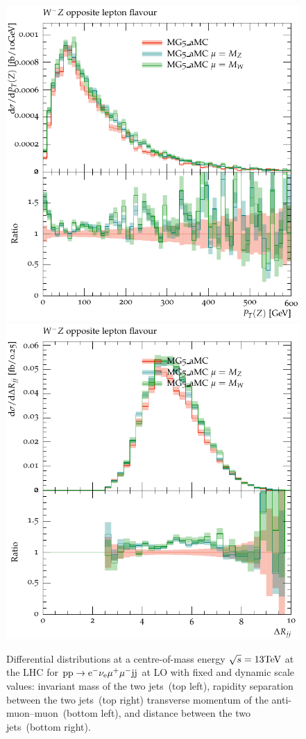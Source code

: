 \begin{figure}[htbp]
\begin{center}
   \includegraphics[scale=0.65]{figs/MG_WmZ_OF_ZPt}
   \includegraphics[scale=0.65]{figs/MG_WmZ_OF_dRjj}
\caption{Differential distributions at a centre-of-mass energy $\sqrt{s}=13{\rm TeV}$ at the LHC for ${\rm p} {\rm p}
  \to {\rm e}^-  \nu_{\rm e}  \mu^+ \mu^- {\rm j} {\rm j}$ at LO with fixed and dynamic scale values: 
                invariant mass of the two jets~(top left),
                rapidity separation between the two jets~(top right)
                transverse momentum of the anti-muon--muon~(bottom left), and
                distance between the two jets~(bottom right).}
\label{vbs_fig_shower_2a}
\end{center}
\end{figure}

